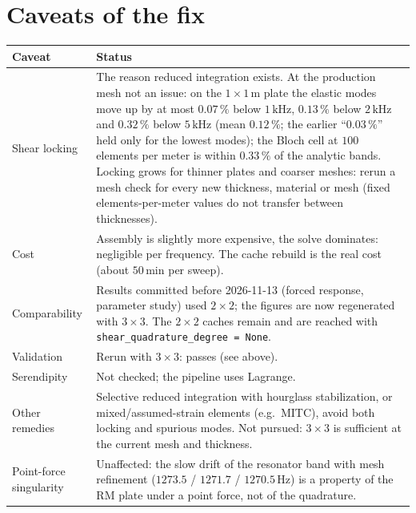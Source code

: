 \documentclass[11pt]{article}
\begin{document}
\section{Caveats of the fix}

\begin{center}
\begin{tabular}{|p{}|p{}|}
\hline
Caveat & Status \\
\hline
Shear locking & The reason reduced integration exists. At the production mesh not an
issue: on the $1\times 1\,\mathrm{m}$ plate the elastic modes move up by at most
$0.07\,\%$ below $1\,\mathrm{kHz}$, $0.13\,\%$ below $2\,\mathrm{kHz}$ and $0.32\,\%$
below $5\,\mathrm{kHz}$ (mean $0.12\,\%$; the earlier ``$0.03\,\%$'' held only for the
lowest modes); the Bloch cell at $100$ elements per meter is within $0.33\,\%$ of the
analytic bands. Locking grows for
thinner plates and coarser meshes: rerun a mesh check for every new thickness,
material or mesh (fixed elements-per-meter values do not transfer between
thicknesses). \\
\hline
Cost & Assembly is slightly more expensive, the solve dominates: negligible per
frequency. The cache rebuild is the real cost (about $50\,\mathrm{min}$ per sweep). \\
\hline
Comparability & Results committed before 2026-11-13 (forced response, parameter
study) used $2\times 2$; the figures are now regenerated with $3\times 3$. The $2\times 2$
caches remain and are reached with \texttt{shear\_quadrature\_degree = None}. \\
\hline
Validation & Rerun with $3\times 3$: passes (see above). \\
\hline
Serendipity & Not checked; the pipeline uses Lagrange. \\
\hline
Other remedies & Selective reduced integration with hourglass stabilization, or
mixed/assumed-strain elements (e.g.\ MITC), avoid both locking and spurious modes.
Not pursued: $3\times 3$ is sufficient at the current mesh and thickness. \\
\hline
Point-force singularity & Unaffected: the slow drift of the resonator band with mesh
refinement ($1273.5$ / $1271.7$ / $1270.5\,\mathrm{Hz}$) is a property of the RM plate
under a point force, not of the quadrature. \\
\hline
\end{tabular}
\end{center}
\end{document}
